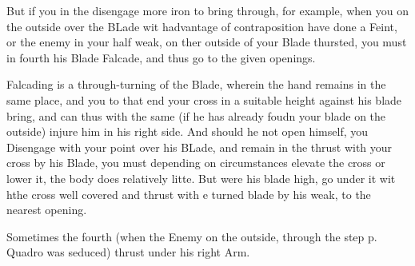 But if you in the disengage more iron to bring through, for example,
when you on the outside over the BLade wit hadvantage of
contraposition have done a Feint, or the enemy in your half weak, on
ther outside of your Blade thursted, you must in fourth his Blade
Falcade, and thus go to the given openings.


Falcading is a through-turning of the Blade, wherein the hand remains
in the same place, and you to that end your cross in a suitable height
against his blade bring, and can thus with the same (if he has already
foudn your blade on the outside) injure him in his right side. And
should he not open himself, you Disengage with your point over his
BLade, and remain in the thrust with your cross by his Blade, you must
depending on circumstances elevate the cross or lower it, the body
does relatively litte. But were his blade high, go under it wit hthe
cross well covered and thrust with e turned blade by his weak, to the
nearest opening.


Sometimes the fourth (when the Enemy on the outside, through the step
p. Quadro was seduced) thrust under his right Arm.


